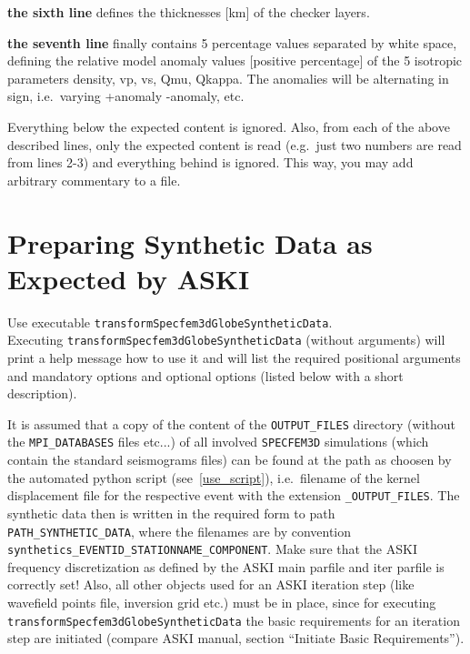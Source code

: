 \documentclass[12pt,a4paper]{article}
\newcommand{\lcode}[1]{\nolinkurl{#1}}
\newcommand{\ASKI}{ {\ttfamily ASKI} }
\begin{document}
{\bf the sixth line} defines the thicknesses [km] of the checker layers.

{\bf the seventh line} finally contains 5 percentage values separated by white space, defining
the relative model anomaly values [positive percentage] of the 5 isotropic parameters 
density, vp, vs, Qmu, Qkappa. The anomalies will be alternating in sign, i.e.\ varying +anomaly -anomaly, etc.

Everything below the expected content is ignored. Also, from each of the above described lines, only the 
expected content is read (e.g.\ just two numbers are read from lines 2-3) and everything behind is ignored.
This way, you may add arbitrary commentary to a file. 

%
\section{Preparing Synthetic Data as Expected by \ASKI} \label{transform_synthetics}
%
Use executable \lcode{transformSpecfem3dGlobeSyntheticData}.\\
Executing 
\lcode{transformSpecfem3dGlobeSyntheticData} (without arguments) will print a
help message how to use it and will list the required positional arguments and mandatory
options and optional options (listed below with a short description).

It is assumed that a copy of the content of the \lcode{OUTPUT_FILES} directory 
(without the \lcode{MPI_DATABASES} files etc...)
of all involved \lcode{SPECFEM3D} simulations (which contain the standard seismograms files) can be found at 
the path as choosen by the automated python script (see~\ref{use_script}), i.e.\ filename of the kernel 
displacement file for the respective event with the extension \lcode{_OUTPUT_FILES}. 
The synthetic data then is written in the required form to path \lcode{PATH_SYNTHETIC_DATA}, where the 
filenames are by convention \lcode{synthetics_EVENTID_STATIONNAME_COMPONENT}. Make sure that the \ASKI frequency 
discretization as defined by the \ASKI main parfile and iter parfile is correctly set! Also, all other objects
used for an \ASKI iteration step (like wavefield points file, inversion grid etc.) must be in place, since
for executing \lcode{transformSpecfem3dGlobeSyntheticData} the basic requirements for an iteration step
are initiated (compare \ASKI manual, section ``Initiate Basic Requirements'').
\end{document}
